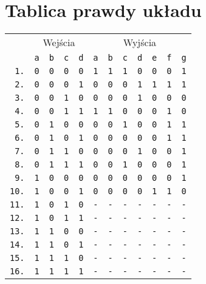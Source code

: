 \documentclass[10pt,a4paper]{article}
\newcommand{\f}[1]{\texttt{#1}}
\begin{document}
\section*{Tablica prawdy układu}
\begin{table}[!ht]
  \centering
  \begin{tabular}{r|cccc|ccccccc}
            & \multicolumn{4}{c|}{Wejścia} & \multicolumn{7}{c}{Wyjścia} \\
            & \f{a} & \f{b} & \f{c} & \f{d} & \f{a} & \f{b} & \f{c} & \f{d} & \f{e} & \f{f} & \f{g} \\
    \midrule
    \f{ 1.} & \f{0} & \f{0} & \f{0} & \f{0} & \f{1} & \f{1} & \f{1} & \f{0} & \f{0} & \f{0} & \f{1} \\
    \f{ 2.} & \f{0} & \f{0} & \f{0} & \f{1} & \f{0} & \f{0} & \f{0} & \f{1} & \f{1} & \f{1} & \f{1} \\
    \f{ 3.} & \f{0} & \f{0} & \f{1} & \f{0} & \f{0} & \f{0} & \f{0} & \f{1} & \f{0} & \f{0} & \f{0} \\
    \f{ 4.} & \f{0} & \f{0} & \f{1} & \f{1} & \f{1} & \f{1} & \f{0} & \f{0} & \f{0} & \f{1} & \f{0} \\
    \f{ 5.} & \f{0} & \f{1} & \f{0} & \f{0} & \f{0} & \f{0} & \f{1} & \f{0} & \f{0} & \f{1} & \f{1} \\
    \f{ 6.} & \f{0} & \f{1} & \f{0} & \f{1} & \f{0} & \f{0} & \f{0} & \f{0} & \f{0} & \f{1} & \f{1} \\
    \f{ 7.} & \f{0} & \f{1} & \f{1} & \f{0} & \f{0} & \f{0} & \f{0} & \f{1} & \f{0} & \f{0} & \f{1} \\
    \f{ 8.} & \f{0} & \f{1} & \f{1} & \f{1} & \f{0} & \f{0} & \f{1} & \f{0} & \f{0} & \f{0} & \f{1} \\
    \f{ 9.} & \f{1} & \f{0} & \f{0} & \f{0} & \f{0} & \f{0} & \f{0} & \f{0} & \f{0} & \f{0} & \f{1} \\
    \f{10.} & \f{1} & \f{0} & \f{0} & \f{1} & \f{0} & \f{0} & \f{0} & \f{0} & \f{1} & \f{1} & \f{0} \\
    \f{11.} & \f{1} & \f{0} & \f{1} & \f{0} & \f{-} & \f{-} & \f{-} & \f{-} & \f{-} & \f{-} & \f{-} \\
    \f{12.} & \f{1} & \f{0} & \f{1} & \f{1} & \f{-} & \f{-} & \f{-} & \f{-} & \f{-} & \f{-} & \f{-} \\
    \f{13.} & \f{1} & \f{1} & \f{0} & \f{0} & \f{-} & \f{-} & \f{-} & \f{-} & \f{-} & \f{-} & \f{-} \\
    \f{14.} & \f{1} & \f{1} & \f{0} & \f{1} & \f{-} & \f{-} & \f{-} & \f{-} & \f{-} & \f{-} & \f{-} \\
    \f{15.} & \f{1} & \f{1} & \f{1} & \f{0} & \f{-} & \f{-} & \f{-} & \f{-} & \f{-} & \f{-} & \f{-} \\
    \f{16.} & \f{1} & \f{1} & \f{1} & \f{1} & \f{-} & \f{-} & \f{-} & \f{-} & \f{-} & \f{-} & \f{-} \\
  \end{tabular}
\end{table}
\pagebreak
\end{document}
